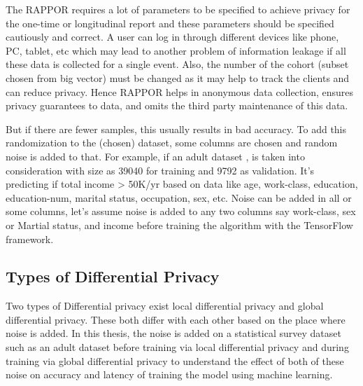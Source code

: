 The RAPPOR requires a lot of parameters to be specified to achieve privacy for the one-time or longitudinal report and these parameters should be specified cautiously and correct. A user can log in through different devices like phone, PC, tablet, etc which may lead to another problem of information leakage if all these data is collected for a single event. Also, the number of the cohort (subset chosen from big vector) must be changed as it may help to track the clients and can reduce privacy. Hence RAPPOR helps in anonymous data collection, ensures privacy guarantees to data, and omits the third party maintenance of this data.

But if there are fewer samples, this usually results in bad accuracy. To add this randomization to the (chosen) dataset, some columns are chosen and random noise is added to that. For example, if an adult dataset \cite{15}, is taken into consideration with size as 39040 for training and 9792 as validation. It's predicting if total income > 50K/yr based on data like age, work-class, education, education-num, marital status, occupation, sex, etc. Noise can be added in all or some columns, let's assume noise is added to any two columns say work-class, sex or Martial status, and income before training the algorithm with the TensorFlow framework. 

\subsection{Types of Differential Privacy}
Two types of Differential privacy exist local differential privacy and global differential privacy. These both differ with each other based on the place where noise is added. In this thesis, the noise is added on a statistical survey dataset such as an adult dataset \cite{15} before training via local differential privacy and during training via global differential privacy to understand the effect of both of these noise on accuracy and latency of training the model using machine learning.

